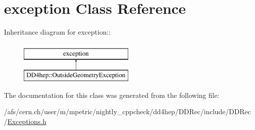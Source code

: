 \hypertarget{classstd_1_1exception}{
\section{exception Class Reference}
\label{classstd_1_1exception}
}
Inheritance diagram for exception::\begin{figure}[H]
\begin{center}
\leavevmode
\includegraphics[height=2cm]{classstd_1_1exception}
\end{center}
\end{figure}


The documentation for this class was generated from the following file:\begin{DoxyCompactItemize}
\item 
/afs/cern.ch/user/m/mpetric/nightly\_\-cppcheck/dd4hep/DDRec/include/DDRec/\hyperlink{_d_d_rec_2include_2_d_d_rec_2_exceptions_8h}{Exceptions.h}\end{DoxyCompactItemize}
